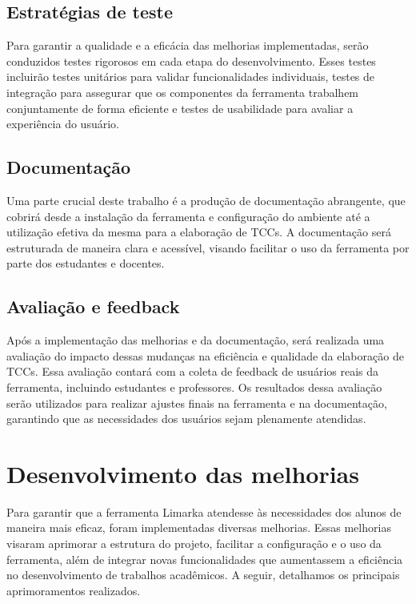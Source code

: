 \documentclass[
	12pt,				%
	oneside,			%
	a4paper,			%
	english,			%
	french,				%
	spanish,			%
	brazil				%
	]{abntex2}
\begin{document}
\hypertarget{estratuxe9gias-de-teste}{%
\section{Estratégias de teste}\label{estratuxe9gias-de-teste}}

Para garantir a qualidade e a eficácia das melhorias implementadas,
serão conduzidos testes rigorosos em cada etapa do desenvolvimento.
Esses testes incluirão testes unitários para validar funcionalidades
individuais, testes de integração para assegurar que os componentes da
ferramenta trabalhem conjuntamente de forma eficiente e testes de
usabilidade para avaliar a experiência do usuário.

\hypertarget{documentauxe7uxe3o}{%
\section{Documentação}\label{documentauxe7uxe3o}}

Uma parte crucial deste trabalho é a produção de documentação
abrangente, que cobrirá desde a instalação da ferramenta e configuração
do ambiente até a utilização efetiva da mesma para a elaboração de TCCs.
A documentação será estruturada de maneira clara e acessível, visando
facilitar o uso da ferramenta por parte dos estudantes e docentes.

\hypertarget{avaliauxe7uxe3o-e-feedback}{%
\section{Avaliação e feedback}\label{avaliauxe7uxe3o-e-feedback}}

Após a implementação das melhorias e da documentação, será realizada uma
avaliação do impacto dessas mudanças na eficiência e qualidade da
elaboração de TCCs. Essa avaliação contará com a coleta de feedback de
usuários reais da ferramenta, incluindo estudantes e professores. Os
resultados dessa avaliação serão utilizados para realizar ajustes finais
na ferramenta e na documentação, garantindo que as necessidades dos
usuários sejam plenamente atendidas.

\hypertarget{desenvolvimento-das-melhorias}{%
\chapter{Desenvolvimento das
melhorias}\label{desenvolvimento-das-melhorias}}

Para garantir que a ferramenta Limarka atendesse às necessidades dos
alunos de maneira mais eficaz, foram implementadas diversas melhorias.
Essas melhorias visaram aprimorar a estrutura do projeto, facilitar a
configuração e o uso da ferramenta, além de integrar novas
funcionalidades que aumentassem a eficiência no desenvolvimento de
trabalhos acadêmicos. A seguir, detalhamos os principais aprimoramentos
realizados.
\end{document}
